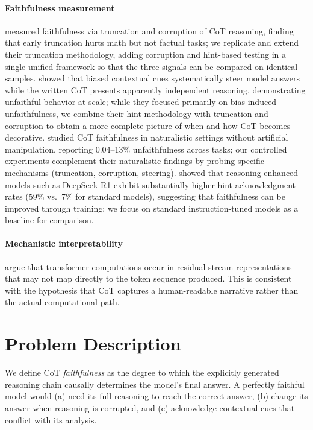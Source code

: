 \documentclass[11pt,twocolumn]{article}
\begin{document}
\paragraph{Faithfulness measurement}
\citet{lanham2023measuring} measured faithfulness via truncation and corruption
of CoT reasoning, finding that early truncation hurts math but not factual
tasks; we replicate and extend their truncation methodology, adding corruption
and hint-based testing in a single unified framework so that the three signals
can be compared on identical samples. \citet{turpin2023language} showed that
biased contextual cues systematically steer model answers while the written
CoT presents apparently independent reasoning, demonstrating unfaithful
behavior at scale; while they focused primarily on bias-induced
unfaithfulness, we combine their hint methodology with truncation and
corruption to obtain a more complete picture of when and how CoT becomes
decorative. \citet{arcuschin2025wild} studied CoT faithfulness in
naturalistic settings without artificial manipulation, reporting 0.04--13\%
unfaithfulness across tasks; our controlled experiments complement their
naturalistic findings by probing specific mechanisms (truncation, corruption,
steering). \citet{chua2025reasoning} showed that reasoning-enhanced models
such as DeepSeek-R1 exhibit substantially higher hint acknowledgment rates
(59\% vs.\ 7\% for standard models), suggesting that faithfulness can be
improved through training; we focus on standard instruction-tuned models as
a baseline for comparison.

\paragraph{Mechanistic interpretability}
\citet{elhage2021mathematical} argue that transformer computations occur in
residual stream representations that may not map directly to the token
sequence produced. This is consistent with the hypothesis that CoT captures
a human-readable narrative rather than the actual computational path.


\section{Problem Description}

We define CoT \emph{faithfulness} as the degree to which the explicitly
generated reasoning chain causally determines the model's final answer. A
perfectly faithful model would (a) need its full reasoning to reach the
correct answer, (b) change its answer when reasoning is corrupted, and
(c) acknowledge contextual cues that conflict with its analysis.
\end{document}
